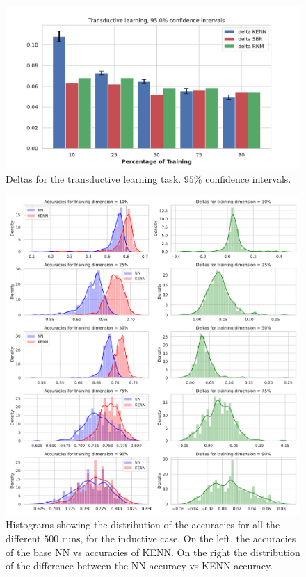 \begin{figure}
	\centering
	\includegraphics[width=0.9\linewidth]{figures/deltas_transductive.pdf}
		\caption{Deltas for the transductive learning task. $95\%$ confidence intervals.}
\end{figure}

\begin{figure}
	\centering
	\includegraphics[width=0.95\linewidth]{figures/histograms_inductive.pdf}
	\caption{Histograms showing the distribution of the accuracies for all the different $500$ runs, for the inductive case. On the left, the accuracies of the base NN vs accuracies of KENN. On the right the distribution of the difference between the NN accuracy vs KENN accuracy.}
\end{figure}

